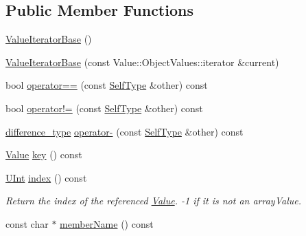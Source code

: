 \subsection*{Public Member Functions}
\begin{DoxyCompactItemize}
\item 
\hyperlink{class_json_1_1_value_iterator_base_af45b028d9ff9cbd2554a87878b42dd75}{Value\-Iterator\-Base} ()
\item 
\hyperlink{class_json_1_1_value_iterator_base_a640e990e5f03a96fd650122a2906f59d}{Value\-Iterator\-Base} (const Value\-::\-Object\-Values\-::iterator \&current)
\item 
bool \hyperlink{class_json_1_1_value_iterator_base_afc656672ac28502f640ade32c38c1b56}{operator==} (const \hyperlink{class_json_1_1_value_iterator_base_a9d2a940d03ea06d20d972f41a89149ee}{Self\-Type} \&other) const 
\item 
bool \hyperlink{class_json_1_1_value_iterator_base_a18c2dd42e0bb989ace141bfe9de52792}{operator!=} (const \hyperlink{class_json_1_1_value_iterator_base_a9d2a940d03ea06d20d972f41a89149ee}{Self\-Type} \&other) const 
\item 
\hyperlink{class_json_1_1_value_iterator_base_a4e44bf8cbd17ec8d6e2c185904a15ebd}{difference\-\_\-type} \hyperlink{class_json_1_1_value_iterator_base_ab786787fcad68ca5e8745aaf520fa17f}{operator-\/} (const \hyperlink{class_json_1_1_value_iterator_base_a9d2a940d03ea06d20d972f41a89149ee}{Self\-Type} \&other) const 
\item 
\hyperlink{class_json_1_1_value}{Value} \hyperlink{class_json_1_1_value_iterator_base_aa2ff5e79fc96acd4c3cd288e92614fc7}{key} () const 
\item 
\hyperlink{namespace_json_a800fb90eb6ee8d5d62b600c06f87f7d4}{U\-Int} \hyperlink{class_json_1_1_value_iterator_base_aa90591f5f7f8d2f06cc4605816b53738}{index} () const 
\begin{DoxyCompactList}\small\item\em Return the index of the referenced \hyperlink{class_json_1_1_value}{Value}. -\/1 if it is not an array\-Value. \end{DoxyCompactList}\item 
const char $\ast$ \hyperlink{class_json_1_1_value_iterator_base_a83768d87c608c8d1133de8721eefc31b}{member\-Name} () const 
\end{DoxyCompactItemize}
